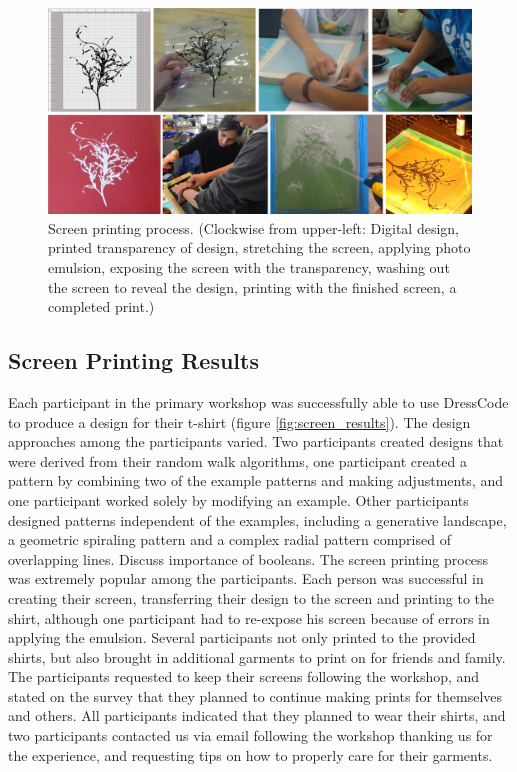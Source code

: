 \documentclass{sigchi}
\begin{document}
\begin{center}
\begin{figure}[h!]
\includegraphics[width=\columnwidth]{images/screen_printing_process.png}
\caption{Screen printing process. (Clockwise from upper-left: Digital design, printed transparency of design, stretching the screen, applying photo emulsion, exposing the screen with the transparency, washing out the screen to reveal the design, printing with the finished screen, a completed print.) }
\label{fig:screen_printing_process}
\end{figure}
\end{center}
\vspace{-20pt}

\subsection{Screen Printing Results}
Each participant in the primary workshop was successfully able to use DressCode to produce a design for their t-shirt (figure \ref{fig:screen_results}). The design approaches among the participants varied. Two participants created designs that were derived from their random walk algorithms, one participant created a pattern by combining two of the example patterns and making adjustments, and one participant worked solely by modifying an example. Other participants designed patterns independent of the examples, including a generative landscape, a geometric spiraling pattern and a complex radial pattern comprised of overlapping lines. Discuss importance of booleans. The screen printing process was extremely popular among the participants. Each person was successful in creating their screen, transferring their design to the screen and printing to the shirt, although one participant had to re-expose his screen because of errors in applying the emulsion. Several participants not only printed to the provided shirts, but also brought in additional garments to print on for friends and family. The participants requested to keep their screens following the workshop, and stated on the survey that they planned to continue making prints for themselves and others. All participants indicated that they planned to wear their shirts, and two participants contacted us via email following the workshop thanking us for the experience, and requesting tips on how to properly care for their garments. 
\end{document}
